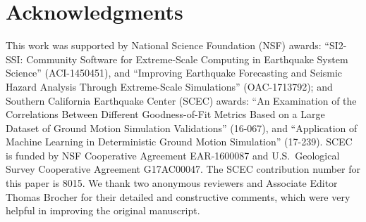 
\section{Acknowledgments}
\small

This work was supported by National Science Foundation (NSF) awards: ``SI2-SSI: Community Software for Extreme-Scale Computing in Earthquake System Science'' (ACI-1450451), and ``Improving Earthquake Forecasting and Seismic Hazard Analysis Through Extreme-Scale Simulations'' (OAC-1713792); and Southern California Earthquake Center (SCEC) awards: ``An Examination of the Correlations Between Different Goodness-of-Fit Metrics Based on a Large Dataset of Ground Motion Simulation Validations'' (16-067), and ``Application of Machine Learning in Deterministic Ground Motion Simulation'' (17-239). SCEC is funded by NSF Cooperative Agreement EAR-1600087 and U.S.~Geological Survey Cooperative Agreement G17AC00047. The SCEC contribution number for this paper is 8015. We thank two anonymous reviewers and Associate Editor Thomas Brocher for their detailed and constructive comments, which were very helpful in improving the original manuscript.


